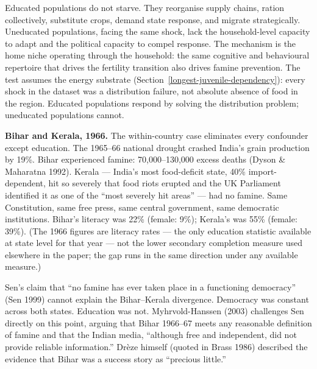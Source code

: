 \documentclass[12pt,letterpaper]{article}
\begin{document}
Educated populations do not starve. They reorganise supply chains, ration collectively, substitute crops, demand state response, and migrate strategically. Uneducated populations, facing the same shock, lack the household-level capacity to adapt and the political capacity to compel response. The mechanism is the home niche operating through the household: the same cognitive and behavioural repertoire that drives the fertility transition also drives famine prevention. The test assumes the energy substrate (Section~\ref{longest-juvenile-dependency}): every shock in the dataset was a distribution failure, not absolute absence of food in the region. Educated populations respond by solving the distribution problem; uneducated populations cannot.

\textbf{Bihar and Kerala, 1966.} The within-country case eliminates every confounder except education. The 1965--66 national drought crashed India's grain production by 19\%. Bihar experienced famine: 70,000--130,000 excess deaths (Dyson \& Maharatna 1992). Kerala --- India's most food-deficit state, 40\% import-dependent, hit so severely that food riots erupted and the UK Parliament identified it as one of the ``most severely hit areas'' --- had no famine. Same Constitution, same free press, same central government, same democratic institutions. Bihar's literacy was 22\% (female: 9\%); Kerala's was 55\% (female: 39\%). (The 1966 figures are literacy rates --- the only education statistic available at state level for that year --- not the lower secondary completion measure used elsewhere in the paper; the gap runs in the same direction under any available measure.)

Sen's claim that ``no famine has ever taken place in a functioning democracy'' (Sen 1999) cannot explain the Bihar--Kerala divergence. Democracy was constant across both states. Education was not. Myhrvold-Hanssen (2003) challenges Sen directly on this point, arguing that Bihar 1966--67 meets any reasonable definition of famine and that the Indian media, ``although free and independent, did not provide reliable information.'' Drèze himself (quoted in Brass 1986) described the evidence that Bihar was a success story as ``precious little.''
\end{document}
